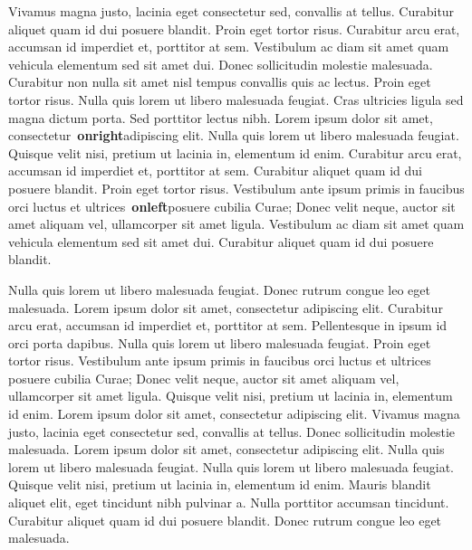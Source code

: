 \documentclass{article}
\begin{document}
\beginnumbering
\autopar
Vivamus magna justo, lacinia eget consectetur sed, convallis at tellus. Curabitur aliquet quam id dui posuere blandit. Proin eget tortor risus. Curabitur arcu erat, accumsan id imperdiet et, porttitor at sem. Vestibulum ac diam sit amet quam vehicula elementum sed sit amet dui. Donec sollicitudin molestie malesuada. Curabitur non nulla sit amet nisl tempus convallis quis ac lectus. Proin eget tortor risus. Nulla quis lorem ut libero malesuada feugiat. Cras ultricies ligula sed magna dictum porta. Sed porttitor lectus nibh. Lorem ipsum dolor sit amet, consectetur\hidenumberingonrightpage\ \textbf{onright}adipiscing elit. Nulla quis lorem ut libero malesuada feugiat. Quisque velit nisi, pretium ut lacinia in, elementum id enim. Curabitur arcu erat, accumsan id imperdiet et, porttitor at sem. Curabitur aliquet quam id dui posuere blandit. Proin eget tortor risus. Vestibulum ante ipsum primis in faucibus orci luctus et ultrices\hidenumberingonleftpage\ \textbf{onleft}posuere cubilia Curae; Donec velit neque, auctor sit amet aliquam vel, ullamcorper sit amet ligula. Vestibulum ac diam sit amet quam vehicula elementum sed sit amet dui. Curabitur aliquet quam id dui posuere blandit.

Nulla quis lorem ut libero malesuada feugiat. Donec rutrum congue leo eget malesuada. Lorem ipsum dolor sit amet, consectetur adipiscing elit. Curabitur arcu erat, accumsan id imperdiet et, porttitor at sem. Pellentesque in ipsum id orci porta dapibus. Nulla quis lorem ut libero malesuada feugiat. Proin eget tortor risus. Vestibulum ante ipsum primis in faucibus orci luctus et ultrices posuere cubilia Curae; Donec velit neque, auctor sit amet aliquam vel, ullamcorper sit amet ligula. Quisque velit nisi, pretium ut lacinia in, elementum id enim. Lorem ipsum dolor sit amet, consectetur adipiscing elit. Vivamus magna justo, lacinia eget consectetur sed, convallis at tellus. Donec sollicitudin molestie malesuada. Lorem ipsum dolor sit amet, consectetur adipiscing elit. Nulla quis lorem ut libero malesuada feugiat. Nulla quis lorem ut libero malesuada feugiat. Quisque velit nisi, pretium ut lacinia in, elementum id enim. Mauris blandit aliquet elit, eget tincidunt nibh pulvinar a. Nulla porttitor accumsan tincidunt. Curabitur aliquet quam id dui posuere blandit. Donec rutrum congue leo eget malesuada.
\end{document}
